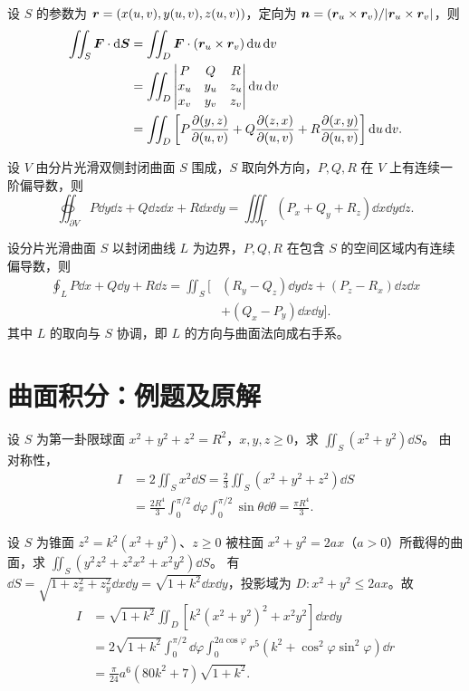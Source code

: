 设 $S$ 的参数为 $\bm{r}=(x(u,v),y(u,v),z(u,v))$，定向为
$\bm{n}=(\bm{r}_u\times\bm{r}_v)/|\bm{r}_u\times\bm{r}_v|$，则
\begin{align*}
\iint_S\bm{F}\cdot\mathop{}\!\mathrm d\bm{S}
&=\iint_D\bm{F}\cdot(\bm{r}_u\times\bm{r}_v)\mathop{}\!\mathrm d u\mathop{}\!\mathrm d v\\
&=\iint_D\begin{vmatrix}P&Q&R\\x_u&y_u&z_u\\x_v&y_v&z_v\end{vmatrix}\mathop{}\!\mathrm d u\mathop{}\!\mathrm d v\\
&=\iint_D\left[P\frac{\partial(y,z)}{\partial(u,v)}+Q\frac{\partial(z,x)}{\partial(u,v)}+R\frac{\partial(x,y)}{\partial(u,v)}\right]\mathop{}\!\mathrm d u\mathop{}\!\mathrm d v.
\end{align*}

设 $V$ 由分片光滑双侧封闭曲面 $S$ 围成，$S$ 取向外方向，$P,Q,R$ 在 $V$ 上有连续一阶偏导数，则
\[
\oiint_{\partial V}P\dd y\dd z+Q\dd z\dd x+R\dd x\dd y
=\iiint_V(P_x+Q_y+R_z)\dd x\dd y\dd z.
\]

设分片光滑曲面 $S$ 以封闭曲线 $L$ 为边界，$P,Q,R$ 在包含 $S$ 的空间区域内有连续偏导数，则
\begin{align*}
\oint_L P\dd x+Q\dd y+R\dd z
=\iint_S\bigl[&(R_y-Q_z)\dd y\dd z+(P_z-R_x)\dd z\dd x\\
&+(Q_x-P_y)\dd x\dd y\bigr].
\end{align*}
其中 $L$ 的取向与 $S$ 协调，即 $L$ 的方向与曲面法向成右手系。

\clearpage
\section{曲面积分：例题及原解}
设 $S$ 为第一卦限球面 $x^2+y^2+z^2=R^2$，$x,y,z\ge0$，求 $\iint_S(x^2+y^2)\dd S$。
\sol 由对称性，
\begin{align*}
I&=2\iint_Sx^2\dd S=\frac23\iint_S(x^2+y^2+z^2)\dd S\\
&=\frac{2R^4}{3}\int_0^{\pi/2}\dd\varphi\int_0^{\pi/2}\sin\theta\dd\theta
=\frac{\pi R^4}{3}.
\end{align*}

设 $S$ 为锥面 $z^2=k^2(x^2+y^2)$、$z\ge0$ 被柱面 $x^2+y^2=2ax$（$a>0$）所截得的曲面，求 $\iint_S(y^2z^2+z^2x^2+x^2y^2)\dd S$。
\sol 有 $\dd S=\sqrt{1+z_x^2+z_y^2}\dd x\dd y=\sqrt{1+k^2}\dd x\dd y$，投影域为 $D:x^2+y^2\le2ax$。故
\begin{align*}
I&=\sqrt{1+k^2}\iint_D[k^2(x^2+y^2)^2+x^2y^2]\dd x\dd y\\
&=2\sqrt{1+k^2}\int_0^{\pi/2}\dd\varphi\int_0^{2a\cos\varphi}r^5(k^2+\cos^2\varphi\sin^2\varphi)\dd r\\
&=\frac\pi{24}a^6(80k^2+7)\sqrt{1+k^2}.
\end{align*}

